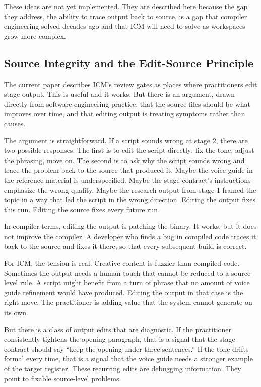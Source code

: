 \documentclass[acmlarge,nonacm,screen]{acmart}
\begin{document}
These ideas are not yet implemented. They are described here because the gap they address, the ability to trace output back to source, is a gap that compiler engineering solved decades ago and that ICM will need to solve as workspaces grow more complex.

\subsection{Source Integrity and the Edit-Source Principle}

The current paper describes ICM's review gates as places where practitioners edit stage output. This is useful and it works. But there is an argument, drawn directly from software engineering practice, that the source files should be what improves over time, and that editing output is treating symptoms rather than causes.

The argument is straightforward. If a script sounds wrong at stage 2, there are two possible responses. The first is to edit the script directly: fix the tone, adjust the phrasing, move on. The second is to ask why the script sounds wrong and trace the problem back to the source that produced it. Maybe the voice guide in the reference material is underspecified. Maybe the stage contract's instructions emphasize the wrong quality. Maybe the research output from stage 1 framed the topic in a way that led the script in the wrong direction. Editing the output fixes this run. Editing the source fixes every future run.

In compiler terms, editing the output is patching the binary. It works, but it does not improve the compiler. A developer who finds a bug in compiled code traces it back to the source and fixes it there, so that every subsequent build is correct.

For ICM, the tension is real. Creative content is fuzzier than compiled code. Sometimes the output needs a human touch that cannot be reduced to a source-level rule. A script might benefit from a turn of phrase that no amount of voice guide refinement would have produced. Editing the output in that case is the right move. The practitioner is adding value that the system cannot generate on its own.

But there is a class of output edits that are diagnostic. If the practitioner consistently tightens the opening paragraph, that is a signal that the stage contract should say ``keep the opening under three sentences.'' If the tone drifts formal every time, that is a signal that the voice guide needs a stronger example of the target register. These recurring edits are debugging information. They point to fixable source-level problems.
\end{document}
